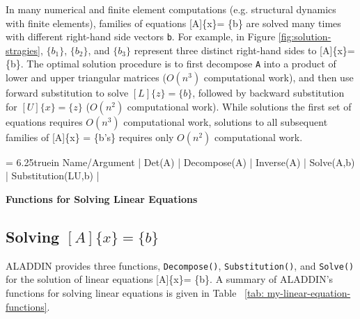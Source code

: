 \vspace{0.15 in}
\noindent\hspace{0.50 in}
In many numerical and finite element
computations (e.g. structural dynamics with finite elements),
families of equations [A]\{x\}= \{b\} are solved many
times with different right-hand side vectors {\tt b}.
For example, in Figure \ref{fig:solution-stragies},
$\{ b_1 \}$, $\{ b_2 \}$, and $\{ b_3 \}$ represent
three distinct right-hand sides to [A]\{x\}= \{b\}.
The optimal solution procedure is to first decompose {\tt A}
into a product of lower and upper triangular
matrices ($O(n^3)$ computational work), and then use forward
substitution to solve $\left[ L \right] \lbrace z \rbrace = \lbrace b \rbrace$,
followed by backward substitution for
$\left[ U \right] \lbrace x \rbrace = \lbrace z \rbrace$ ($O(n^2)$ computational work).
While solutions the first set of equations requires $O(n^3)$ computational work,
solutions to all subsequent families of [A]\{x\} = \{b's\} requires only
$O(n^2)$ computational work. 

\begin{table}[t]
\tablewidth = 6.25truein
\begintable
Name/Argument |                                      \crthick
Det(A)        |                                \cr
Decompose(A)  |      \cr
Inverse(A)    |                   \cr
Solve(A,b)    |             \cr
Substitution(LU,b) |    
\endtable
\vspace{0.01 in}
\caption{\bf Functions for Solving Linear Equations}
\label{tab: my-linear-equation-functions}
\end{table}

\subsection{Solving $\left[ A \right] \lbrace x \rbrace = \lbrace b \rbrace$}

\vspace{0.15 in}
\noindent\hspace{0.50 in}
ALADDIN provides three functions,
{\tt Decompose()}, {\tt Substitution()}, and {\tt Solve()}
for the solution of linear equations [A]\{x\}= \{b\}.
A summary of ALADDIN's functions for solving linear equations
is given in Table ~\ref{tab: my-linear-equation-functions}.


